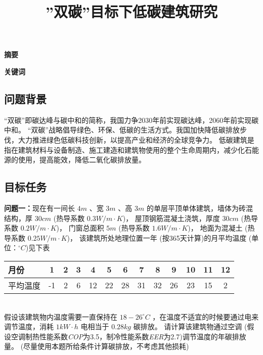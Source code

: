 \documentclass[a4paper, 12pt]{article}
\numberwithin{equation}{section}
\begin{document}
    \title{''双碳''目标下低碳建筑研究}
    \author{}
    \date{}
    \maketitle

    \centerline{\textbf{\LARGE{摘要}}}

    \textbf{\large{关键词}}

    {}
        \subsection{问题背景}
        “双碳”即碳达峰与碳中和的简称，我国力争2030年前实现碳达峰，2060年前实现碳中和。
        “双碳”战略倡导绿色、环保、低碳的生活方式。我国加快降低碳排放步伐，大力推进绿色低碳科技创新，以提高产业和经济的全球竞争力。
        低碳建筑是指在建筑材料与设备制造、施工建造和建筑物使用的整个生命周期内，减少化石能源的使用，提高能效，降低二氧化碳排放量。

        \subsection{目标任务}
            \textbf{问题一：}现在有一间长 $ 4 m $ 、宽 $ 3 m $ 、高 $ 3 m $ 的单层平顶单体建筑，墙体为砖混结构，厚 $ 30 cm $ (热导系数 $ 0.3 W / m \cdot K $)，
            屋顶钢筋混凝土浇筑，厚度 $ 30 cm $ (热导系数 $ 0.2 W / m \cdot K $)，
            门窗总面积 $ 5 m $ (热导系数 $ 1.6 W / m \cdot K $)，
            地面为混凝土 (热导系数 $ 0.25 W / m \cdot K $)，
            该建筑所处地理位置一年 (按365天计算)的月平均温度 (单位：$ ^{\circ} C $)见下表 \\
            \begin{table}
                \centering
                \begin{tabular}{|l|c|c|c|c|c|c|c|c|c|c|c|c|}
                    \hline
                    月份 & 1 & 2 & 3 & 4 & 5 & 6 & 7 & 8 & 9 & 10 & 11 & 12 \\
                    \hline
                    平均温度 & -1 & 2 & 6 & 12 & 22 & 28 & 31 & 32 & 26 & 23 & 15 & 2\\
                    \hline
                \end{tabular}
            \end{table}
            \\ 假设该建筑物内温度需要一直保持在 $ 18 - 26 ^{\circ}C $ ，在温度不适宜的时候要通过电来调节温度，消耗 $ 1 kW \cdot h $ 电相当于 $ 0.28kg $ 碳排放。
            请计算该建筑物通过空调 (假设空调制热性能系数\textit{COP}为3.5，制冷性能系数\textit{EER}为2.7)调节温度的年碳排放量。
            (尽量使用本题所给条件计算碳排放，不考虑其他损耗)
\end{document}
